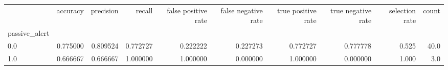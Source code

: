 \begin{tabular}{lrrrrrrrrr}
\toprule
{} &  accuracy &  precision &    recall &  false positive rate &  false negative rate &  true positive rate &  true negative rate &  selection rate &  count \\
passive\_alert &           &            &           &                      &                      &                     &                     &                 &        \\
\midrule
0.0           &  0.775000 &   0.809524 &  0.772727 &             0.222222 &             0.227273 &            0.772727 &            0.777778 &           0.525 &   40.0 \\
1.0           &  0.666667 &   0.666667 &  1.000000 &             1.000000 &             0.000000 &            1.000000 &            0.000000 &           1.000 &    3.0 \\
\bottomrule
\end{tabular}

